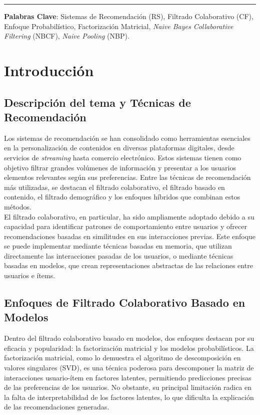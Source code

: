 \documentclass[twocolumn, fontsize=10pt]{article}
\begin{document}
\rule{\linewidth}{0.5pt}

\noindent \textbf{Palabras Clave}: Sistemas de Recomendación (RS), Filtrado Colaborativo (CF), Enfoque Probabilístico, Factorización Matricial, \textit{Naive Bayes Collaborative Filtering} (NBCF), \textit{Naive Pooling} (NBP).




\tableofcontents

\section{Introducción}

\subsection{Descripción del tema y Técnicas de Recomendación}

Los sistemas de recomendación se han consolidado como 
herramientas esenciales en la personalización de 
contenidos en diversas plataformas digitales, 
desde servicios de \textit{streaming} hasta comercio electrónico. 
Estos sistemas tienen como objetivo filtrar grandes 
volúmenes de información y presentar a los usuarios 
elementos relevantes según sus preferencias. 
Entre las técnicas de recomendación más utilizadas, 
se destacan el filtrado colaborativo, el filtrado 
basado en contenido, el filtrado demográfico y los enfoques híbridos que 
combinan estos métodos.\\

El filtrado colaborativo, en particular, 
ha sido ampliamente adoptado debido a su capacidad 
para identificar patrones de comportamiento entre 
usuarios y ofrecer recomendaciones basadas en 
similitudes en sus interacciones previas. 
Este enfoque se puede implementar mediante técnicas 
basadas en memoria, que utilizan directamente las 
interacciones pasadas de los usuarios, o mediante 
técnicas basadas en modelos, que crean representaciones 
abstractas de las relaciones entre usuarios e ítems.

\subsection{Enfoques de Filtrado Colaborativo Basado en Modelos}

Dentro del filtrado colaborativo basado en modelos, 
dos enfoques destacan por su eficacia y popularidad: 
la factorización matricial y los modelos probabilísticos. 
La factorización matricial, como lo demuestra el 
algoritmo de descomposición en valores singulares (SVD), 
es una técnica poderosa para descomponer la matriz de 
interacciones usuario-ítem en factores latentes, 
permitiendo predicciones precisas de las preferencias 
de los usuarios. No obstante, su principal limitación 
radica en la falta de interpretabilidad de los factores 
latentes, lo que dificulta la explicación de las 
recomendaciones generadas.\\
\end{document}
